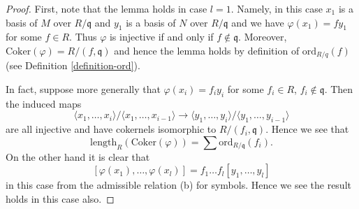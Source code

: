 \begin{proof}
First, note that the lemma holds in case $l = 1$.
Namely, in this case $x_1$ is a basis of $M$ over $R/\mathfrak q$
and $y_1$ is a basis of $N$ over $R/\mathfrak q$ and we have
$\varphi(x_1) = fy_1$ for some $f \in R$. Thus $\varphi$ is injective
if and only if $f \not \in \mathfrak q$. Moreover,
$\text{Coker}(\varphi) = R/(f, \mathfrak q)$ and hence the lemma
holds by definition of $\text{ord}_{R/q}(f)$
(see Definition \ref{definition-ord}).

\medskip\noindent
In fact, suppose more generally that $\varphi(x_i) = f_iy_i$ for some
$f_i \in R$, $f_i \not \in \mathfrak q$. Then the induced maps
$$
\langle x_1, \ldots, x_i\rangle / \langle x_1, \ldots, x_{i - 1}\rangle
\longrightarrow
\langle y_1, \ldots, y_i\rangle / \langle y_1, \ldots, y_{i - 1}\rangle
$$
are all injective and have cokernels isomorphic to
$R/(f_i, \mathfrak q)$. Hence we see that
$$
\text{length}_R(\text{Coker}(\varphi)) = \sum \text{ord}_{R/\mathfrak q}(f_i).
$$
On the other hand it is clear that
$$
[\varphi(x_1), \ldots, \varphi(x_l)] = f_1 \ldots f_l [y_1, \ldots, y_l]
$$
in this case from the admissible relation (b) for symbols.
Hence we see the result holds in this case also.


\end{proof}
